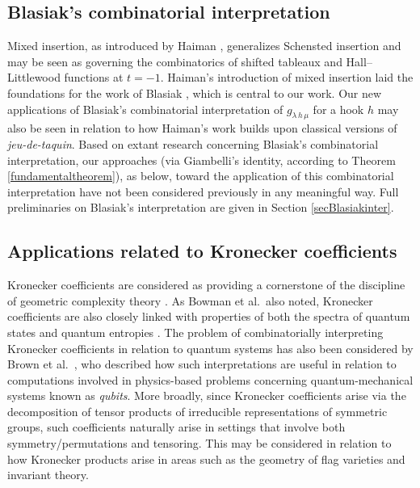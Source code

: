 \documentclass[12pt]{article}
\begin{document}
\subsection{Blasiak's combinatorial interpretation}
 Mixed insertion, as introduced by Haiman \cite{Haiman1989}, generalizes Schensted insertion and may be seen as governing the 
 combinatorics of shifted tableaux and Hall--Littlewood functions at $t = -1$. 
 Haiman's introduction of mixed insertion laid the foundations for the work of Blasiak 
 \cite{Blasiak20162018}, which is central to our work. Our new applications of Blasiak's combinatorial interpretation of $g_{\lambda 
 \, h \, \mu}$ for a hook $h$ may also be seen in relation to how Haiman's work builds upon classical versions of \emph{jeu-de-taquin}. 
 Based on extant research concerning Blasiak's combinatorial interpretation, 
 our approaches (via Giambelli's identity, according to Theorem \ref{fundamentaltheorem}), as below, toward the application of 
 this combinatorial interpretation have not been considered previously in any meaningful way. 
 Full preliminaries on Blasiak's interpretation are given in Section \ref{secBlasiakinter}. 

\subsection{Applications related to Kronecker coefficients}
 Kronecker coefficients are considered as providing a cornerstone of the discipline of geometric complexity theory 
 \cite{BowmanDeVisscherEnyang2021}. As Bowman et al.\ also noted, Kronecker coefficients are also closely linked with properties 
 of both the spectra of quantum states \cite{ChristandlHarrowMitchison2007,ChristandlMitchison2006} and quantum entropies 
 \cite{ChristandlSahinogluWalter2018}. The problem of combinatorially interpreting Kronecker coefficients in relation to quantum systems
 has also been considered by Brown et al.\ \cite{BrownvanWilligenburgZabrocki2010}, who described how such interpretations are useful 
 in relation to computations involved in physics-based problems concerning quantum-mechanical systems known as \emph{qubits}. 
 More broadly, since Kronecker coefficients arise via the decomposition of tensor products of irreducible representations of symmetric 
 groups, such coefficients naturally arise in settings that involve both symmetry/permutations and tensoring. This may be considered in 
 relation to how Kronecker products arise in areas such as the geometry of flag varieties and invariant theory. 
\end{document}
